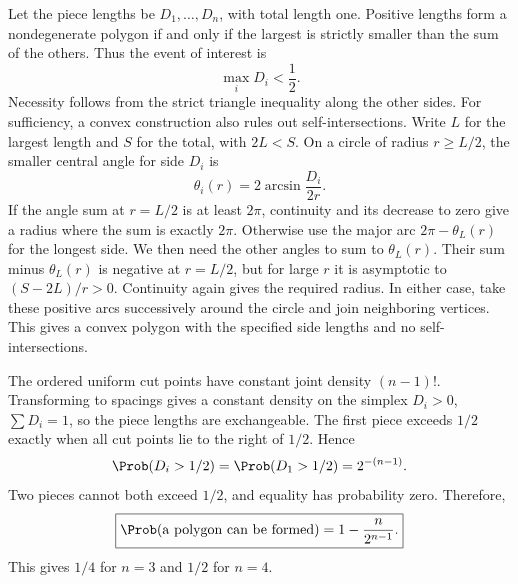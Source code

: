 Let the piece lengths be $D_1,\ldots,D_n$, with total length one. Positive lengths form a nondegenerate polygon if and only if the largest is strictly smaller than the sum of the others. Thus the event of interest is
\[
\max_iD_i<\frac12.
\]
Necessity follows from the strict triangle inequality along the other sides. For sufficiency, a convex construction also rules out self-intersections. Write $L$ for the largest length and $S$ for the total, with $2L<S$. On a circle of radius $r\ge L/2$, the smaller central angle for side $D_i$ is
\[
\theta_i(r)=2\arcsin\frac{D_i}{2r}.
\]
If the angle sum at $r=L/2$ is at least $2\pi$, continuity and its decrease to zero give a radius where the sum is exactly $2\pi$. Otherwise use the major arc $2\pi-\theta_L(r)$ for the longest side. We then need the other angles to sum to $\theta_L(r)$. Their sum minus $\theta_L(r)$ is negative at $r=L/2$, but for large $r$ it is asymptotic to $(S-2L)/r>0$. Continuity again gives the required radius. In either case, take these positive arcs successively around the circle and join neighboring vertices. This gives a convex polygon with the specified side lengths and no self-intersections.

The ordered uniform cut points have constant joint density $(n-1)!$. Transforming to spacings gives a constant density on the simplex $D_i>0$, $\sum D_i=1$, so the piece lengths are exchangeable. The first piece exceeds $1/2$ exactly when all cut points lie to the right of $1/2$. Hence
\[
\Prob(D_i>1/2)=\Prob(D_1>1/2)=2^{-(n-1)}.
\]
Two pieces cannot both exceed $1/2$, and equality has probability zero. Therefore,
\[
\boxed{\Prob(\text{a polygon can be formed})=1-\frac{n}{2^{n-1}}.}
\]
This gives $1/4$ for $n=3$ and $1/2$ for $n=4$.
